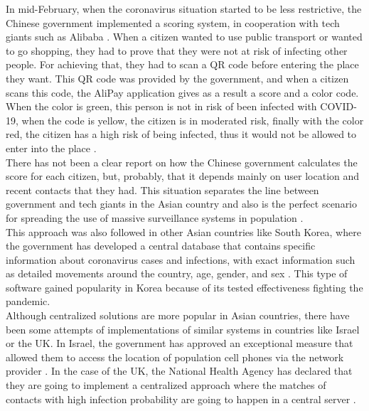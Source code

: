 \documentclass[a4paper, 12pt]{article}
\begin{document}
In mid-February, when the coronavirus situation started to be less restrictive, the Chinese government implemented a scoring system, in cooperation with tech giants such as Alibaba \cite{china-massive-covid-tracking}. When a citizen wanted to use public transport or wanted to go shopping, they had to prove that they were not at risk of infecting other people. For achieving that, they had to scan a QR code before entering the place they want. This QR code was provided by the government, and when a citizen scans this code, the AliPay application gives as a result a score and a color code. When the color is green, this person is not in risk of been infected with COVID-19, when the code is yellow, the citizen is in moderated risk, finally with the color red, the citizen has a high risk of being infected, thus it would not be allowed to enter into the place \cite{china-qr-codes}. \\

There has not been a clear report on how the Chinese government calculates the score for each citizen, but, probably, that it depends mainly on user location and recent contacts that they had. This situation separates the line between government and tech giants in the Asian country and also is the perfect scenario for spreading the use of massive surveillance systems in population \cite{china-qr-codes}. \\

This approach was also followed in other Asian countries like South Korea, where the government has developed a central database that contains specific information about coronavirus cases and infections, with exact information such as detailed movements around the country, age, gender, and sex \cite{south-korea-surveillance}. This type of software gained popularity in Korea because of its tested effectiveness fighting the pandemic. \\

Although centralized solutions are more popular in Asian countries, there have been some attempts of implementations of similar systems in countries like Israel or the UK. In Israel, the government has approved an exceptional measure that allowed them to access the location of population cell phones via the network provider \cite{israel-covid-tracing}. In the case of the UK, the National Health Agency has declared that they are going to implement a centralized approach where the matches of contacts with high infection probability are going to happen in a central server \cite{uk-tracking}.\\
\end{document}
